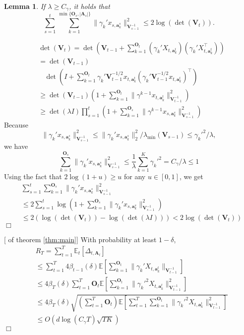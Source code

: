 \documentclass{article}
\newcommand{\EE}{\mathbb{E}}
\newcommand{\bA}{\mathbf{A}}
\newcommand{\ba}{\mathbf{a}}
\newcommand{\bO}{\mathbf{O}}
\newcommand{\bV}{\mathbf{V}}
\newcommand{\abs}[1]{\left| #1 \right|}
\newcommand{\norm}[1]{\| #1 \|}
\newtheorem{lemma}[theorem]{Lemma}%
\newenvironment{proof}{\noindent {\textbf{Proof. }}}{$\Box$ \medskip}
\begin{document}
\begin{lemma}
If $\lambda \geq C_\gamma$, it holds that
$$
\sum_{s=1}^t \sum_{k=1}^{\min\{\bO_s, \abs{\bA_s}\}} \norm{\gamma_k' x_{s,\ba_{k}^s}}_{\bV_{s-1}^{-1}}^2 \leq 2\log(\det(\bV_t)).
$$
\end{lemma}
\begin{proof}
\begin{align*}
&\det(\bV_t) = \det(\bV_{t-1} + \sum_{k=1}^{\bO_t} (\gamma_k' X_{t,\ba_k^{t}})(\gamma_k' X_{t, \ba_k^{t}}^{\top}))\\
&=\det(\bV_{t-1})\\
&~~~~\det(I + \sum_{k=1}^{\bO_t} \gamma_k'\bV_{t-1}^{-1/2}x_{t,\ba_{k}^{t}} (\gamma_k' \bV_{t-1}^{-1/2}x_{t,\ba_{k}^{t}})^{\top})\\
&\geq \det(\bV_{t-1}) (1 + \sum_{k=1}^{\bO_t} \norm{\gamma^{k-1}x_{t,\ba_k^t}}_{\bV_{t-1}^{-1}}^2)\\
&\geq \det(\lambda I)\prod_{s=1}^{t}(1 + \sum_{k=1}^{\bO_s} \norm{\gamma^{k-1}x_{s,\ba_k^s}}_{\bV_{s-1}^{-1}}^2)
\end{align*}
Because
$$
\norm{\gamma_k' x_{s,\ba_k^s}}_{\bV_{s-1}^{-1}}^2 \leq \norm{\gamma_k' x_{s,\ba_k^s}}_2^2/\lambda_{\min}(\bV_{s-1}) \leq \gamma_k'^2 /\lambda,
$$
we have 
$$
\sum_{k=1}^{\bO_s} \norm{\gamma_k' x_{s,\ba_k^s}}_{\bV_{s-1}^{-1}}^2 \leq \frac{1}{\lambda} \sum_{k=1}^{K} \gamma_k'^2 = C_\gamma /\lambda \leq 1
$$
Using the fact that $ 2\log(1+u) \geq u$ for any $u \in [0,1]$, we get
\begin{align*}
&\sum_{s=1}^t \sum_{k=1}^{\bO_s}\norm{\gamma_k' x_{s,\ba_{k}^s}}_{\bV_{s-1}^{-1}}^2 \\
&\leq 2\sum_{s=1}^t\log(1 + \sum_{k=1}^{\bO_s} \norm{\gamma_k' x_{s,\ba_k^s}}_{\bV_{s-1}^{-1}}^2)\\
&\leq 2(\log(\det(\bV_t)) - \log(\det(\lambda I))) < 2\log(\det(\bV_t))
\end{align*}
\end{proof}

\begin{proof}[ of theorem \ref{thm:main}]
With probability at least $1-\delta$,
\begin{equation}
\begin{split}
&R_T =\sum_{t=1}^{T} \EE_{t}[\Delta_{t, \bA_t}] \\
&\leq \sum_{t=1}^{T} 4 \beta_{t-1}(\delta) \EE[\sum_{k=1}^{\bO_t}\norm{\gamma_k' X_{t,\ba_k^t}}_{\bV_{t-1}^{-1}}]\\
&\leq 4 \beta_T(\delta) \sum_{t=1}^{T} \bO_t \EE[\sum_{k=1}^{\bO_t}\norm{\gamma_k'^2 X_{t,\ba_k^t}}_{\bV_{t-1}^{-1}}^2]\\
&\leq 4 \beta_T(\delta) \sqrt{(\sum_{t=1}^{T} \bO_t) \EE[\sum_{t=1}^{T} \sum_{k=1}^{\bO_t}\norm{\gamma_k'^2 X_{t,\ba_k^t}}_{\bV_{t-1}^{-1}}^2]}  \\
&\leq O(d\log(C_\gamma T)\sqrt{TK})
\end{split}
\end{equation}
\end{proof}
	
	
	


	
\end{document}
